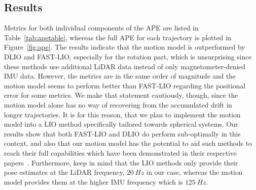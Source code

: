 \subsection{Results}
Metrics for both individual components of the APE are listed in Table~\ref{tab:apetable}, whereas the full APE for each trajectory is plotted in Figure~\ref{fig:ape}.
The results indicate that the motion model is outperformed by DLIO and FAST-LIO, especially for the rotation part, which is unsurprising since these methods use additional LiDAR data instead of only magnetometer-denied IMU data.
However, the metrics are in the same order of magnitude and the motion model seems to perform better than FAST-LIO regarding the positional error for some metrics.
We make that statement cautiously, though, since the motion model alone has no way of recovering from the accumulated drift in longer trajectories.
It is for this reason, that we plan to implement the motion model into a LIO method specifically tailored towards spherical systems.
Our results show that both FAST-LIO and DLIO do perform sub-optimally in this context, and also that our motion model has the potential to aid such methods to reach their full capabilities which have been demonstrated in their respective papers~\cite{xu2022fast, 10160508}. 
Furthermore, keep in mind that the LIO methods only provide their pose estimates at the LiDAR frequency, $\SI{20}{Hz}$ in our case, whereas the motion model provides them at the higher IMU frequency which is $\SI{125}{Hz}$.

